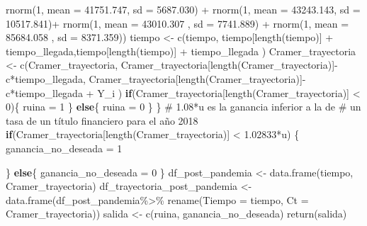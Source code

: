 \documentclass[
  us-letterpaper,
]{scrreprt}
\newenvironment{Shaded}{\begin{snugshade}}{\end{snugshade}}
\newcommand{\AttributeTok}[1]{\textcolor[rgb]{0.40,0.45,0.13}{#1}}
\newcommand{\CommentTok}[1]{\textcolor[rgb]{0.37,0.37,0.37}{#1}}
\newcommand{\ControlFlowTok}[1]{\textcolor[rgb]{0.00,0.23,0.31}{\textbf{#1}}}
\newcommand{\DecValTok}[1]{\textcolor[rgb]{0.68,0.00,0.00}{#1}}
\newcommand{\FloatTok}[1]{\textcolor[rgb]{0.68,0.00,0.00}{#1}}
\newcommand{\FunctionTok}[1]{\textcolor[rgb]{0.28,0.35,0.67}{#1}}
\newcommand{\NormalTok}[1]{\textcolor[rgb]{0.00,0.23,0.31}{#1}}
\newcommand{\OtherTok}[1]{\textcolor[rgb]{0.00,0.23,0.31}{#1}}
\newcommand{\SpecialCharTok}[1]{\textcolor[rgb]{0.37,0.37,0.37}{#1}}
\theoremstyle{plain}
\theoremstyle{plain}
\theoremstyle{definition}
\theoremstyle{remark}
\begin{document}
\begin{Shaded}
\begin{Highlighting}[]
               \FunctionTok{rnorm}\NormalTok{(}\DecValTok{1}\NormalTok{, }\AttributeTok{mean =}   \FloatTok{41751.747}\NormalTok{, }\AttributeTok{sd =} \FloatTok{5687.030}\NormalTok{) }\SpecialCharTok{+} 
               \FunctionTok{rnorm}\NormalTok{(}\DecValTok{1}\NormalTok{, }\AttributeTok{mean =}   \FloatTok{43243.143}\NormalTok{, }\AttributeTok{sd =} \FloatTok{10517.841}\NormalTok{)}\SpecialCharTok{+} 
               \FunctionTok{rnorm}\NormalTok{(}\DecValTok{1}\NormalTok{, }\AttributeTok{mean =} \FloatTok{43010.307}\NormalTok{  , }\AttributeTok{sd =} \FloatTok{7741.889}\NormalTok{) }\SpecialCharTok{+} 
               \FunctionTok{rnorm}\NormalTok{(}\DecValTok{1}\NormalTok{, }\AttributeTok{mean =}  \FloatTok{85684.058}\NormalTok{ , }\AttributeTok{sd =} \FloatTok{8371.359}\NormalTok{)) }
\NormalTok{    tiempo }\OtherTok{\textless{}{-}} \FunctionTok{c}\NormalTok{(tiempo, tiempo[}\FunctionTok{length}\NormalTok{(tiempo)] }\SpecialCharTok{+} 
\NormalTok{                  tiempo\_llegada,tiempo[}\FunctionTok{length}\NormalTok{(tiempo)] }\SpecialCharTok{+} 
\NormalTok{                  tiempo\_llegada ) }
\NormalTok{    Cramer\_trayectoria }\OtherTok{\textless{}{-}} \FunctionTok{c}\NormalTok{(Cramer\_trayectoria,}
\NormalTok{                      Cramer\_trayectoria[}\FunctionTok{length}\NormalTok{(Cramer\_trayectoria)]}\SpecialCharTok{{-}}
\NormalTok{                      c}\SpecialCharTok{*}\NormalTok{tiempo\_llegada, }
\NormalTok{                      Cramer\_trayectoria[}\FunctionTok{length}\NormalTok{(Cramer\_trayectoria)]}\SpecialCharTok{{-}} 
\NormalTok{                      c}\SpecialCharTok{*}\NormalTok{tiempo\_llegada }\SpecialCharTok{+}\NormalTok{  Y\_i )}
    \ControlFlowTok{if}\NormalTok{(Cramer\_trayectoria[}\FunctionTok{length}\NormalTok{(Cramer\_trayectoria)] }\SpecialCharTok{\textless{}} \DecValTok{0}\NormalTok{)\{}
\NormalTok{      ruina }\OtherTok{=} \DecValTok{1}
\NormalTok{    \}}
    \ControlFlowTok{else}\NormalTok{\{}
\NormalTok{      ruina }\OtherTok{=} \DecValTok{0}
\NormalTok{    \}}
\NormalTok{  \}}
\CommentTok{\# 1.08*u es la ganancia inferior a la de }
\CommentTok{\# un tasa de un título financiero para el año 2018}
  \ControlFlowTok{if}\NormalTok{(Cramer\_trayectoria[}\FunctionTok{length}\NormalTok{(Cramer\_trayectoria)] }\SpecialCharTok{\textless{}} \FloatTok{1.02833}\SpecialCharTok{*}\NormalTok{u) \{}
\NormalTok{    ganancia\_no\_deseada }\OtherTok{=} \DecValTok{1}
    
\NormalTok{  \} }
  \ControlFlowTok{else}\NormalTok{\{}
\NormalTok{    ganancia\_no\_deseada }\OtherTok{=} \DecValTok{0}
\NormalTok{  \}}
\NormalTok{  df\_post\_pandemia }\OtherTok{\textless{}{-}} \FunctionTok{data.frame}\NormalTok{(tiempo, Cramer\_trayectoria)}
\NormalTok{  df\_trayectoria\_post\_pandemia }\OtherTok{\textless{}{-}} \FunctionTok{data.frame}\NormalTok{(df\_post\_pandemia}\SpecialCharTok{\%\textgreater{}\%} 
                                  \FunctionTok{rename}\NormalTok{(}\AttributeTok{Tiempo =}\NormalTok{ tiempo, }
                                         \AttributeTok{Ct =}\NormalTok{ Cramer\_trayectoria))}
\NormalTok{  salida }\OtherTok{\textless{}{-}} \FunctionTok{c}\NormalTok{(ruina, ganancia\_no\_deseada)}
  \FunctionTok{return}\NormalTok{(salida)}
  

\end{Highlighting}
\end{Shaded}
\end{document}
